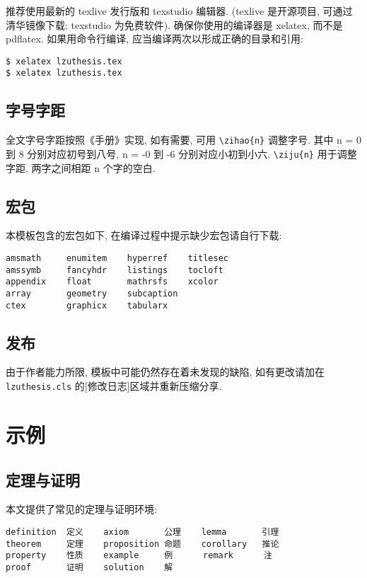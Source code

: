 \documentclass{lzuthesis}
\begin{document}
推荐使用最新的 texlive 发行版和 texstudio 编辑器.
(texlive 是开源项目, 可通过清华镜像下载; texstudio 为免费软件).
确保你使用的编译器是 xelatex, 而不是 pdflatex. 如果用命令行编译,
应当编译两次以形成正确的目录和引用:

\begin{verbatim}
$ xelatex lzuthesis.tex
$ xelatex lzuthesis.tex
\end{verbatim}

\subsection{字号字距}

全文字号字距按照《手册》实现, 如有需要, 可用 \verb|\zihao{n}| 调整字号. 其中 n = 0 到 8 分别对应初号到八号, n = -0 到 -6 分别对应小初到小六. \verb|\ziju{n}| 用于调整字距, 两字之间相距 n 个字的空白.

\subsection{宏包}

本模板包含的宏包如下, 在编译过程中提示缺少宏包请自行下载:

\begin{verbatim}
amsmath     enumitem    hyperref    titlesec
amssymb     fancyhdr    listings    tocloft
appendix    float       mathrsfs    xcolor
array       geometry    subcaption
ctex        graphicx    tabularx
\end{verbatim}

\subsection{发布}

由于作者能力所限, 模板中可能仍然存在着未发现的缺陷, 如有更改请加在
\texttt{lzuthesis.cls} 的[修改日志]区域并重新压缩分享. 

\section{示例}

\subsection{定理与证明}

本文提供了常见的定理与证明环境:

\begin{verbatim}
definition  定义    axiom       公理    lemma       引理
theorem     定理    proposition 命题    corollary   推论
property    性质    example     例      remark      注
proof       证明    solution    解
\end{verbatim}
\end{document}
